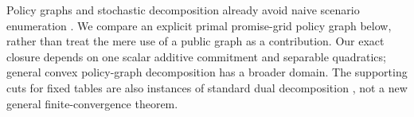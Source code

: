 Policy graphs and stochastic decomposition already avoid naive scenario enumeration \citep{PereiraPinto1991,Girardeau2015,Dowson2020}. We compare an explicit primal promise-grid policy graph below, rather than treat the mere use of a public graph as a contribution. Our exact closure depends on one scalar additive commitment and separable quadratics; general convex policy-graph decomposition has a broader domain. The supporting cuts for fixed tables are also instances of standard dual decomposition \citep{Benders1962,BoydVandenberghe2004}, not a new general finite-convergence theorem.
